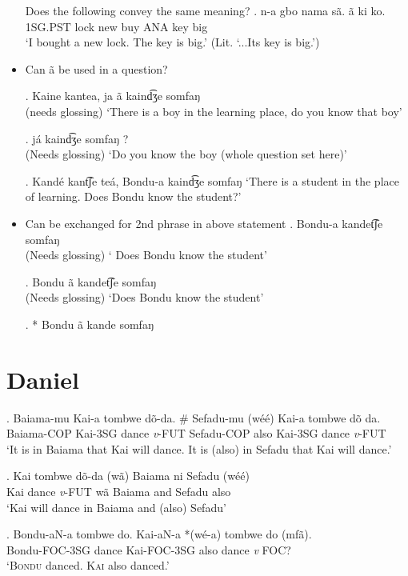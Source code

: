 \documentclass{assets/fieldnotes}
\begin{document}
\begin{itemize}
    Does the following convey the same meaning?
     \exg. n-a gbo nama sã. ã ki ko.\\
        1SG.PST lock new buy ANA key big\\
        `I bought a new lock. The key is big.' (Lit. `...Its key is big.')

    \item Can ã be used in a question?

\exg. Kaine kantea, ja ã kaind͡ʒe somfaŋ\\
(needs glossing)
`There is a boy in the learning place, do you know that boy'

\exg. já kaind͡ʒe somfaŋ ?\\
(Needs glossing)
`Do you know the boy (whole question set here)'
    
\exg. Kandé kant͡ʃe teá, Bondu-a kaind͡ʒe somfaŋ
`There is a student in the place of learning. Does Bondu know the student?'

\item Can be exchanged for 2nd phrase in above statement
\exg. Bondu-a kandet͡ʃe somfaŋ\\
(Needs glossing)
` Does Bondu know the student' 

\exg. Bondu ã kandet͡ʃe somfaŋ\\
(Needs glossing)
`Does Bondu know the student'

\ex. * Bondu ã kande somfaŋ\\
    
\end{itemize}


\section{Daniel}
\exg. Baiama-mu Kai-a tombwe dõ-da. \# Sefadu-mu (wéé) Kai-a tombwe dõ da.\\
Baiama-COP Kai-3SG dance \textit{v}-FUT {} Sefadu-COP also Kai-3SG dance \textit{v}-FUT\\
`It is in Baiama that Kai will dance. It is (also) in Sefadu that Kai will dance.'

\exg. Kai tombwe dõ-da (wã) Baiama ni Sefadu (wéé)\\
Kai dance \textit{v}-FUT wã Baiama and Sefadu also\\
`Kai will dance in Baiama and (also) Sefadu'

\exg. Bondu-aN-a tombwe do. Kai-aN-a *(wé-a) tombwe do (mfã).\\
Bondu-FOC-3SG dance  Kai-FOC-3SG also dance \textit{v} FOC?\\
`\textsc{Bondu} danced. \textsc{Kai} also danced.'
\end{document}
